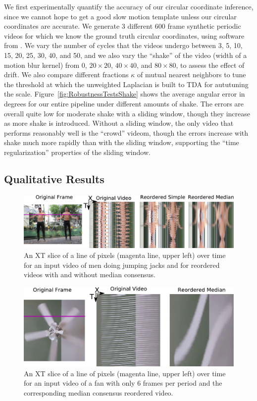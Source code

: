 \documentclass{article}
\begin{document}
We first experimentally quantify the accuracy of our circular coordinate inference, since we cannot hope to get a good slow motion template unless our circular coordinates are accurate.  We generate 3 different 600 frame synthetic periodic videos for which we know the ground truth circular coordinates, using software from \cite{jacobson2012fast}.  We vary the number of cycles that the videos undergo between 3, 5, 10, 15, 20, 25, 30, 40, and 50, and we also vary the ``shake'' of the video (width of a motion blur kernel) from 0, $20 \times 20$, $40 \times 40$, and $80 \times 80$, to assess the effect of drift.  We also compare different fractions $\kappa$ of mutual nearest neighbors to tune the threshold at which the unweighted Laplacian is built to TDA for aututuning the scale.  Figure~\ref{fig:RobustnessTestsShake} shows the average angular error in degrees for our entire pipeline under different amounts of shake.  The errors are overall quite low for moderate shake with a sliding window, though they increase as more shake is introduced.  Without a sliding window, the only video that performs reasonably well is the ``crowd'' videom, though the errors increase with shake much more rapidly than with the sliding window, supporting the ``time regularization'' properties of the sliding window.


\subsection{Qualitative Results}
\begin{figure}
\centering
\includegraphics[width=\columnwidth]{XTSliceJumpingJacks.pdf}
\caption{An XT slice of a line of pixels (magenta line, upper left) over time for an input video of men doing jumping jacks and for reordered videos with and without median consensus.}
\label{fig:XTSliceJumpingJacks}
\end{figure}

\begin{figure}
\centering
\includegraphics[width=\columnwidth]{XTSliceFan.pdf}
\caption{An XT slice of a line of pixels (magenta line, upper left) over time for an input video of a fan with only 6 frames per period and the corresponding median consensus reordered video.}
\label{fig:XTSliceFan}
\end{figure}
\end{document}
